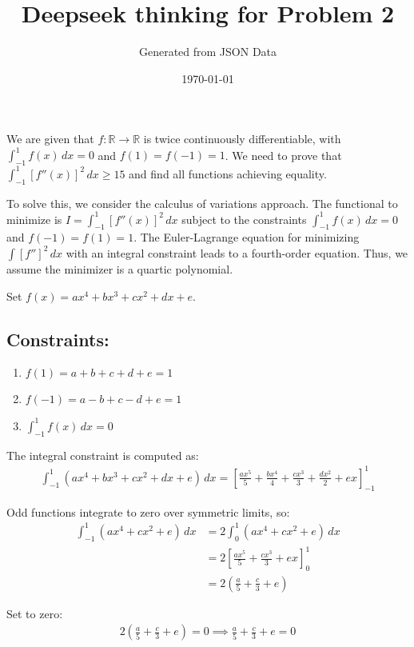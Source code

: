 \documentclass[12pt,a4paper]{article}
\title{Deepseek thinking for Problem 2}
\author{Generated from JSON Data}
\date{\today}
\theoremstyle{definition}
\begin{document}
    We are given that $f: \mathbb{R} \to \mathbb{R}$ is twice continuously differentiable, with $\int_{-1}^{1} f(x) \, dx = 0$ and $f(1) = f(-1) = 1$. We need to prove that $\int_{-1}^{1} [f''(x)]^2 \, dx \geq 15$ and find all functions achieving equality.

    To solve this, we consider the calculus of variations approach. The functional to minimize is $I = \int_{-1}^{1} [f''(x)]^2 \, dx$ subject to the constraints $\int_{-1}^{1} f(x) \, dx = 0$ and $f(-1) = f(1) = 1$. The Euler-Lagrange equation for minimizing $\int [f'']^2 \, dx$ with an integral constraint leads to a fourth-order equation. Thus, we assume the minimizer is a quartic polynomial.

    Set $f(x) = a x^4 + b x^3 + c x^2 + d x + e$.

    \subsection*{Constraints:}
    \begin{enumerate}
        \item $f(1) = a + b + c + d + e = 1$
        \item $f(-1) = a - b + c - d + e = 1$
        \item $\int_{-1}^{1} f(x) \, dx = 0$
    \end{enumerate}

    The integral constraint is computed as:
    \begin{align}
        \int_{-1}^{1} (a x^4 + b x^3 + c x^2 + d x + e) \, dx = \left[ \frac{a x^5}{5} + \frac{b x^4}{4} + \frac{c x^3}{3} + \frac{d x^2}{2} + e x \right]_{-1}^{1}
    \end{align}

    Odd functions integrate to zero over symmetric limits, so:
    \begin{align}
        \int_{-1}^{1} (a x^4 + c x^2 + e) \, dx &= 2 \int_{0}^{1} (a x^4 + c x^2 + e) \, dx \\
        &= 2 \left[ \frac{a x^5}{5} + \frac{c x^3}{3} + e x \right]_{0}^{1} \\
        &= 2 \left( \frac{a}{5} + \frac{c}{3} + e \right)
    \end{align}

    Set to zero:
    \begin{align}
        2 \left( \frac{a}{5} + \frac{c}{3} + e \right) = 0 \implies \frac{a}{5} + \frac{c}{3} + e = 0
    \end{align}
\end{document}
